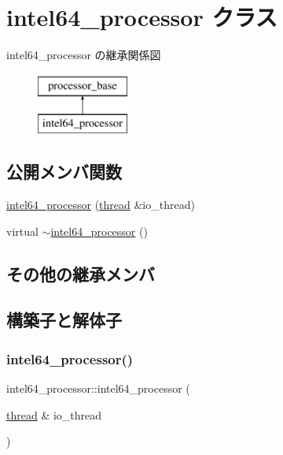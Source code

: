\hypertarget{classintel64__processor}{}\section{intel64\+\_\+processor クラス}
\label{classintel64__processor}
intel64\+\_\+processor の継承関係図\begin{figure}[H]
\begin{center}
\leavevmode
\includegraphics[height=2.000000cm]{classintel64__processor}
\end{center}
\end{figure}
\subsection*{公開メンバ関数}
\begin{DoxyCompactItemize}
\item 
\hyperlink{classintel64__processor_af2c58d6afbd813bf3e3c0bf7061e1c12}{intel64\+\_\+processor} (\hyperlink{classthread}{thread} \&io\+\_\+thread)
\item 
virtual \hyperlink{classintel64__processor_ad3532e98841618af0b850b7c0186fd8d}{$\sim$intel64\+\_\+processor} ()
\end{DoxyCompactItemize}
\subsection*{その他の継承メンバ}


\subsection{構築子と解体子}
\hypertarget{classintel64__processor_af2c58d6afbd813bf3e3c0bf7061e1c12}{}\label{classintel64__processor_af2c58d6afbd813bf3e3c0bf7061e1c12} 
\subsubsection{\texorpdfstring{intel64\+\_\+processor()}{intel64\_processor()}}
{\footnotesize\ttfamily intel64\+\_\+processor\+::intel64\+\_\+processor (\begin{DoxyParamCaption}\item[{\hyperlink{classthread}{thread} \&}]{io\+\_\+thread }\end{DoxyParamCaption})}

